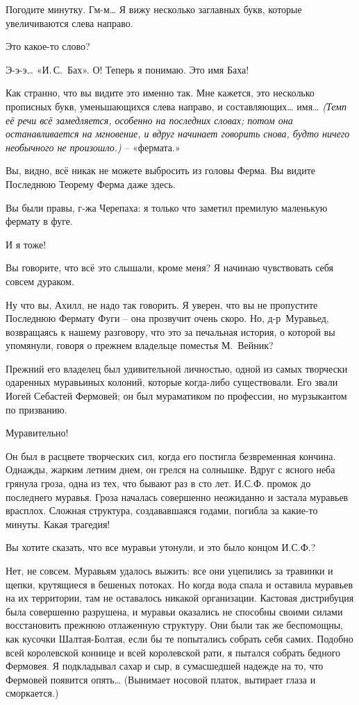 \documentclass[../main.tex]{subfiles}
\begin{document}
\begin{dialogue}
 Погодите минутку. Гм-м\ldots{} Я вижу несколько заглавных букв, которые увеличиваются слева направо.

 Это какое-то слово?

 Э-э-э\ldots{} «И.\,С.~Бах». О! Теперь я понимаю. Это имя Баха!

 Как странно, что вы видите это именно так. Мне кажется, это несколько прописных букв, уменьшающихся слева направо, и составляющих\ldots{} имя\ldots{} \emph{(Темп её речи всё замедляется, особенно на последних словах; потом она останавливается на мгновение, и вдруг начинает говорить снова, будто ничего необычного не произошло.)} \--- «фермата.»

 Вы, видно, всё никак не можете выбросить из головы Ферма. Вы видите Последнюю Теорему Ферма даже здесь.

 Вы были правы, г-жа Черепаха: я только что заметил премилую маленькую фермату в фуге.

 И я тоже!

 Вы говорите, что всё это слышали, кроме меня? Я начинаю чувствовать себя совсем дураком.

 Ну что вы, Ахилл, не надо так говорить. Я уверен, что вы не пропустите Последнюю Фермату Фуги \--- она прозвучит очень скоро. Но, д-р~Муравьед, возвращаясь к нашему разговору, что это за печальная история, о которой вы упомянули, говоря о прежнем владельце поместья М.~Вейник?

 Прежний его владелец был удивительной личностью, одной из самых творчески одаренных муравьиных колоний, которые когда-либо существовали. Его звали Иогей Себастей Фермовей; он был мураматиком по профессии, но мурзыкантом по призванию.

 Муравительно!

 Он был в расцвете творческих сил, когда его постигла безвременная кончина. Однажды, жарким летним днем, он грелся на солнышке. Вдруг с ясного неба грянула гроза, одна из тех, что бывают раз в сто лет. И.С.Ф. промок до последнего муравья. Гроза началась совершенно неожиданно и застала муравьев врасплох. Сложная структура, создававшаяся годами, погибла за какие-то минуты. Какая трагедия!

 Вы хотите сказать, что все муравьи утонули, и это было концом И.С.Ф.?

 Нет, не совсем. Муравьям удалось выжить: все они уцепились за травинки и щепки, крутящиеся в бешеных потоках. Но когда вода спала и оставила муравьев на их территории, там не оставалось никакой организации. Кастовая дистрибуция была совершенно разрушена, и муравьи оказались не способны своими силами восстановить прежнюю отлаженную структуру. Они были так же беспомощны, как кусочки Шалтая-Болтая, если бы те попытались собрать себя самих. Подобно всей королевской коннице и всей королевской рати, я пытался собрать бедного Фермовея. Я подкладывал сахар и сыр, в сумасшедшей надежде на то, что Фермовей появится опять\ldots{} (Вынимает носовой платок, вытирает глаза и сморкается.)


\end{dialogue}
\end{document}
